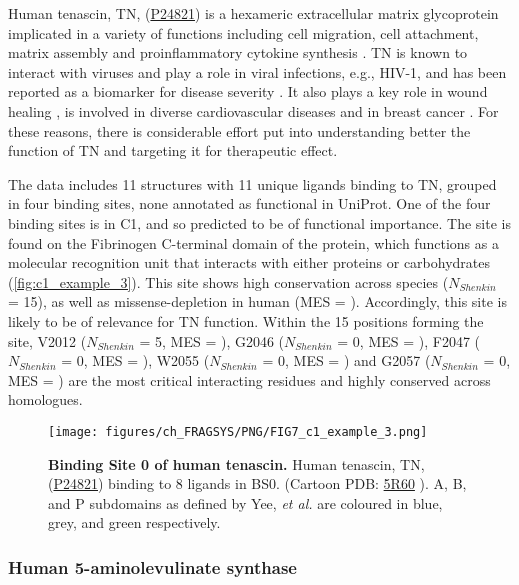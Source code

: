 Human tenascin, TN, (\href{https://www.uniprot.org/uniprotkb/P24821/entry}{P24821}) is a hexameric extracellular matrix glycoprotein implicated in a variety of functions including cell migration, cell attachment, matrix assembly and proinflammatory cytokine synthesis \cite{BHATTACHARYYA_2022_TNC}. TN is known to interact with viruses and play a role in viral infections, e.g., HIV-1, and has been reported as a biomarker for disease severity \cite{ZULIANI_2023_TNC}. It also plays a key role in wound healing \cite{WANG_2022_TNC}, is involved in diverse cardiovascular diseases \cite{KHOMTCHOUK_2022_TNC} and in breast cancer \cite{LEPUCKI_2022_TNC}. For these reasons, there is considerable effort put into understanding better the function of TN and targeting it for therapeutic effect.

The data includes 11 structures with 11 unique ligands binding to TN, grouped in four binding sites, none annotated as functional in UniProt. One of the four binding sites is in C1, and so predicted to be of functional importance. The site is found on the Fibrinogen C-terminal domain of the protein, which functions as a molecular recognition unit that interacts with either proteins or carbohydrates (\autoref{fig:c1_example_3}). This site shows high conservation across species ($N_{Shenkin}$ = 15), as well as missense-depletion in human (MES = ). Accordingly, this site is likely to be of relevance for TN function. Within the 15 positions forming the site, V2012 ($N_{Shenkin}$ = 5, MES = ), G2046 ($N_{Shenkin}$ = 0, MES = ), F2047 ($N_{Shenkin}$ = 0, MES = ), W2055 ($N_{Shenkin}$ = 0, MES = ) and G2057 ($N_{Shenkin}$ = 0, MES = ) are the most critical interacting residues and highly conserved across homologues.

\begin{figure}[htb!]
    \centering
    \texttt{[image: figures/ch\_FRAGSYS/PNG/FIG7\_c1\_example\_3.png]}
    \caption[Binding Site 0 of human tenascin]{\textbf{Binding Site 0 of human tenascin.} Human tenascin, TN, (\href{https://www.uniprot.org/uniprotkb/P24821/entry}{P24821}) binding to 8 ligands in BS0. (Cartoon PDB: \href{https://www.ebi.ac.uk/pdbe/entry/pdb/5r60}{5R60} \cite{PDB_5R60}). A, B, and P subdomains as defined by Yee, \textit{et al.} \cite{YEE_1997_FIBRINOGEN} are coloured in blue, grey, and green respectively.}
    \label{fig:c1_example_3}
\end{figure}

\subsubsection{Human 5-aminolevulinate synthase}

